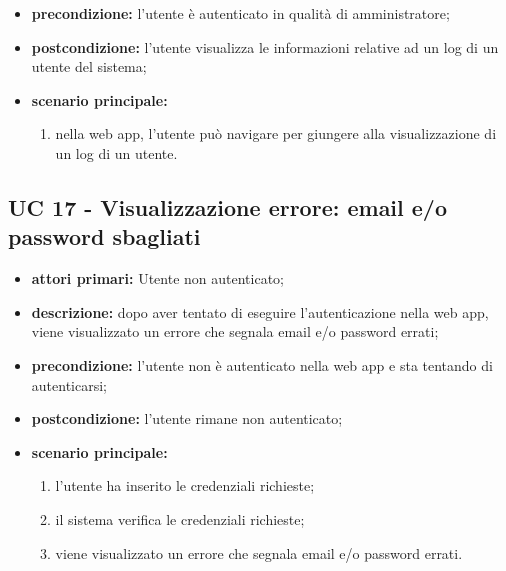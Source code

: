\begin{itemize}
			\item \textbf{precondizione:} l'utente è autenticato in qualità di amministratore;
			\item \textbf{postcondizione:} l'utente visualizza le informazioni relative ad un log di un utente del sistema;
			\item \textbf{scenario principale:}
			\begin{enumerate}
				\item nella web app, l'utente può navigare per giungere alla visualizzazione di un log di un utente.
			\end{enumerate}	
		\end{itemize}
		


		


		


		 


		\subsection{UC 17 - Visualizzazione errore: email e/o password sbagliati}
		\begin{itemize}
			\item \textbf{attori primari:} Utente non autenticato;
			\item \textbf{descrizione:} dopo aver tentato di eseguire l'autenticazione nella web app, viene visualizzato un errore che segnala email e/o password errati;
			\item \textbf{precondizione:} l'utente non è autenticato nella web app e sta tentando di autenticarsi;
			\item \textbf{postcondizione:} l'utente rimane non autenticato;
			\item \textbf{scenario principale:}
			\begin{enumerate}
				\item l'utente ha inserito le credenziali richieste;
				\item il sistema verifica le credenziali richieste;
				\item viene visualizzato un errore che segnala email e/o password errati.
			\end{enumerate}
		\end{itemize}

